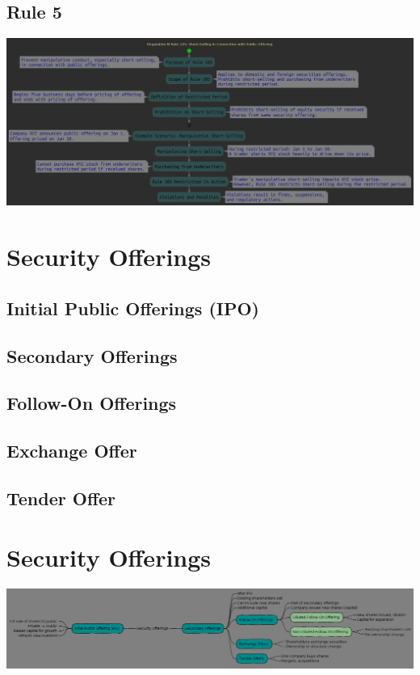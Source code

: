 \documentclass[11pt]{article}
\begin{document}
\subsection{Rule 5}
\label{sec:org27e5c53}

\begin{center}
\includegraphics[width=.9\linewidth]{./Regulation_M_Rule_105.png}
\end{center}


\section{Security Offerings}
\label{sec:org62ac142}
\subsection{Initial Public Offerings (IPO)}
\label{sec:org6a875e6}
\subsection{Secondary Offerings}
\label{sec:org6dbeda3}
\subsection{Follow-On Offerings}
\label{sec:orge42d0a0}
\subsection{Exchange Offer}
\label{sec:org15733cb}
\subsection{Tender Offer}
\label{sec:org0c56a16}

\section{Security Offerings}
\label{sec:org2feadc4}
\begin{center}
\includegraphics[width=.9\linewidth]{./security_offerings.png}
\end{center}
\end{document}
